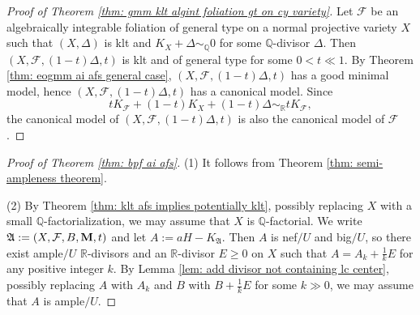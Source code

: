 \documentclass[12pt]{amsart}
\numberwithin{equation}{section}
\newcommand{\Mm}{{\bf{M}}}
\newcommand{\Rr}{\mathbb{R}}
\newcommand{\Aa}{{\mathfrak{A}}}
\newcommand{\Ff}{\mathcal{F}}
\theoremstyle{definition}
\theoremstyle{definition}
\theoremstyle{definition}
\begin{document}
\begin{proof}[Proof of Theorem \ref{thm: gmm klt algint foliation gt on cy variety}]
    Let $\Ff$ be an algebraically integrable foliation
    of general type on a normal projective variety $X$ such that $(X,\Delta)$ is klt and $K_X+\Delta\sim_{\mathbb Q}0$ for some $\mathbb Q$-divisor $\Delta$. Then $(X,\Ff,(1-t)\Delta,t)$ is klt and of general type for some $0<t\ll 1$. By Theorem \ref{thm: eogmm ai afs general case}, $(X,\Ff,(1-t)\Delta,t)$ has a good minimal model, hence $(X,\Ff,(1-t)\Delta,t)$ has a canonical model. Since
    $$tK_{\Ff}+(1-t)K_X+(1-t)\Delta\sim_{\mathbb R} tK_{\Ff},$$
    the canonical model of $(X,\Ff,(1-t)\Delta,t)$ is also the canonical model of $\Ff$.
\end{proof}



\begin{proof}[Proof of Theorem \ref{thm: bpf ai afs}]
(1) It follows from Theorem \ref{thm: semi-ampleness theorem}. 

(2) By Theorem \ref{thm: klt afs implies potentially klt}, possibly replacing $X$ with a small $\mathbb Q$-factorialization, we may assume that $X$ is $\mathbb Q$-factorial. We write $\Aa:=(X,\Ff,B,\Mm,t)$ and let $A:=aH-K_{\Aa}$. Then $A$ is nef$/U$ and big$/U$, so there exist ample$/U$ $\Rr$-divisors and an $\Rr$-divisor $E\geq 0$ on $X$ such that $A=A_k+\frac{1}{k}E$ for any positive integer $k$. By Lemma \ref{lem: add divisor not containing lc center}, possibly replacing $A$ with $A_k$ and $B$ with $B+\frac{1}{k}E$ for some $k\gg 0$, we may assume that $A$ is ample$/U$.


\end{proof}
\end{document}
